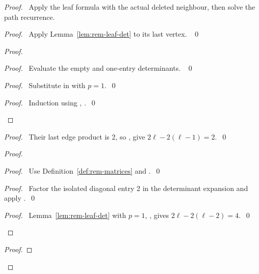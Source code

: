 \begin{proof}
\pfsketch\ Apply the leaf formula with the actual deleted neighbour,
then solve the path recurrence.
\begin{proof}\pf\ Apply Lemma~\ref{lem:rem-leaf-det} to its last vertex. ~\qed\end{proof}
\begin{proof}
\begin{proof}\pf\ Evaluate the empty and one-entry determinants. ~\qed\end{proof}
\begin{proof}\pf\ Substitute in  with $p=1$.~\qed\end{proof}
\qedstep
\begin{proof}\pf\ Induction using , .~\qed\end{proof}
\end{proof}
\begin{proof}\pf\ Their last edge product is 2, so
,  give $2\ell-2(\ell-1)=2$.~\qed\end{proof}
\begin{proof}
\begin{proof}\pf\ Use Definition~\ref{def:rem-matrices} and .~\qed\end{proof}
\begin{proof}\pf\ Factor the isolated diagonal entry 2 in the
determinant expansion and apply .~\qed\end{proof}
\qedstep
\begin{proof}\pf\ Lemma~\ref{lem:rem-leaf-det} with $p=1$,
,  gives $2\ell-2(\ell-2)=4$.~\qed\end{proof}
\end{proof}
\begin{proof}

\end{proof}
\end{proof}
